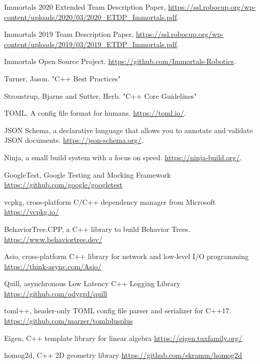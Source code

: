 \documentclass[runningheads]{llncs}
\begin{document}
\newpage
\begin{thebibliography}{8}
Immortals 2020 Extended Team Description Paper, \url{https://ssl.robocup.org/wp-content/uploads/2020/03/2020\_ETDP\_Immortals.pdf}.

Immortals 2019 Team Description Paper, \url{https://ssl.robocup.org/wp-content/uploads/2019/03/2019\_ETDP\_Immortals.pdf}.

Immortals Open Source Project. \url{https://github.com/Immortals-Robotics}.

Turner, Jason. "C++ Best Practices"

Stroustrup, Bjarne and Sutter, Herb. "C++ Core Guidelines"

TOML, A config file format for humans. \url{https://toml.io/}.

JSON Schema, a declarative language that allows you to annotate and validate JSON documents. \url{https://json-schema.org/}.

Ninja, a small build system with a focus on speed. \url{https://ninja-build.org/}.

GoogleTest, Google Testing and Mocking Framework \url{https://github.com/google/googletest}

vcpkg, cross-platform C/C++ dependency manager from Microsoft \url{https://vcpkg.io/}

BehaviorTree.CPP, a C++ library to build Behavior Trees. \url{https://www.behaviortree.dev/}

Asio, cross-platform C++ library for network and low-level I/O programming \url{https://think-async.com/Asio/}

Quill, asynchronous Low Latency C++ Logging Library \url{https://github.com/odygrd/quill}

toml++, header-only TOML config file parser and serializer for C++17. \url{https://github.com/marzer/tomlplusplus}

Eigen, C++ template library for linear algebra \url{https://eigen.tuxfamily.org/}

homog2d, C++ 2D geometry library \url{https://github.com/skramm/homog2d}

\end{thebibliography}
\end{document}

